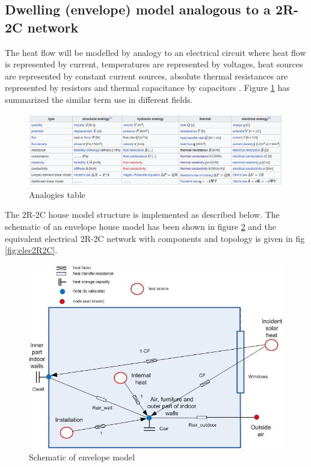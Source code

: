 \subsection{Dwelling (envelope) model analogous to a 2R-2C network}

The heat flow will be modelled by analogy to an electrical circuit where heat flow is represented by current, temperatures are represented by voltages, heat sources are represented by constant current sources, absolute thermal resistances are represented by resistors and thermal capacitance by capacitors \cite{AbsTR}. Figure \ref{fig:Analogies} has summarized the similar term use in different fields.

\begin{figure}[H]
	\centering
	\includegraphics[width=1.0\columnwidth]{Pictures/Analogies.png}
	\caption[Short title]{Analogies table  \cite{AbsTR}}
	\label{fig:Analogies}
	\end{figure} 

The 2R-2C house model structure is implemented as described below. The schematic of an envelope house model has been shown in figure  \ref{fig:envelope2R2C} and the equivalent electrical 2R-2C network with components and topology is given in fig  \ref{fig:elec2R2C}.

\begin{figure}[H]
	\centering
	\includegraphics[width=1.0\columnwidth]{Pictures/envelopRC.jpg}
	\caption[Short title]{Schematic of envelope model}
	\label{fig:envelope2R2C}
	\end{figure} 
	

